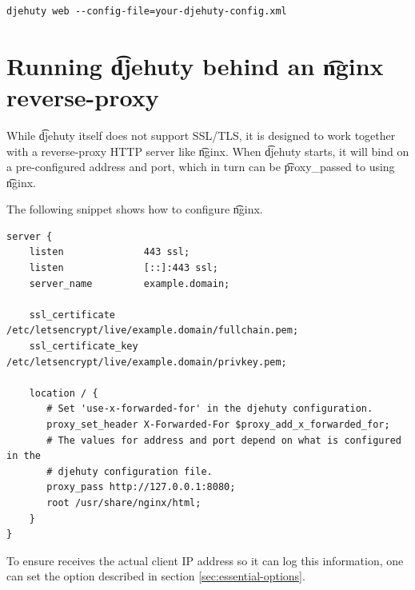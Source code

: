\begin{lstlisting}
djehuty web --config-file=your-djehuty-config.xml
\end{lstlisting}

\section{Running \t{djehuty} behind an \t{nginx} reverse-proxy}

  While \t{djehuty} itself does not support SSL/TLS, it is designed to
  work together with a reverse-proxy HTTP server like \t{nginx}.  When
  \t{djehuty} starts, it will bind on a pre-configured address and port,
  which in turn can be \t{proxy\_pass}ed to using \t{nginx}.

  The following snippet shows how to configure \t{nginx}.

\begin{lstlisting}
server {
    listen              443 ssl;
    listen              [::]:443 ssl;
    server_name         example.domain;

    ssl_certificate     /etc/letsencrypt/live/example.domain/fullchain.pem;
    ssl_certificate_key /etc/letsencrypt/live/example.domain/privkey.pem;

    location / {
       # Set 'use-x-forwarded-for' in the djehuty configuration.
       proxy_set_header X-Forwarded-For $proxy_add_x_forwarded_for;
       # The values for address and port depend on what is configured in the
       # djehuty configuration file.
       proxy_pass http://127.0.0.1:8080;
       root /usr/share/nginx/html;
    }
}
\end{lstlisting}

  To ensure  receives the actual client IP address so it can log
  this information, one can set the  option
  described in section \ref{sec:essential-options}.
